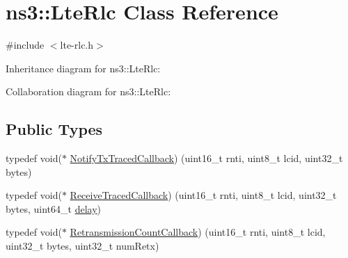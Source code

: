 \hypertarget{classns3_1_1LteRlc}{}\section{ns3\+:\+:Lte\+Rlc Class Reference}
\label{classns3_1_1LteRlc}


{\ttfamily \#include $<$lte-\/rlc.\+h$>$}



Inheritance diagram for ns3\+:\+:Lte\+Rlc\+:


Collaboration diagram for ns3\+:\+:Lte\+Rlc\+:
\subsection*{Public Types}
\begin{DoxyCompactItemize}
\item 
typedef void($\ast$ \hyperlink{classns3_1_1LteRlc_a41405fe841fb799c6b7bf166d0d80210}{Notify\+Tx\+Traced\+Callback}) (uint16\+\_\+t rnti, uint8\+\_\+t lcid, uint32\+\_\+t bytes)
\item 
typedef void($\ast$ \hyperlink{classns3_1_1LteRlc_aa13a88c19fd59d8a963e0760a03c9133}{Receive\+Traced\+Callback}) (uint16\+\_\+t rnti, uint8\+\_\+t lcid, uint32\+\_\+t bytes, uint64\+\_\+t \hyperlink{mmwave_2model_2fading-traces_2fading__trace__generator_8m_a7964e6aa8f61a9d28973c8267a606ad8}{delay})
\item 
typedef void($\ast$ \hyperlink{classns3_1_1LteRlc_a57e59c15759a6c30fe1ced85b09dbaca}{Retransmission\+Count\+Callback}) (uint16\+\_\+t rnti, uint8\+\_\+t lcid, uint32\+\_\+t bytes, uint32\+\_\+t num\+Retx)
\end{DoxyCompactItemize}
